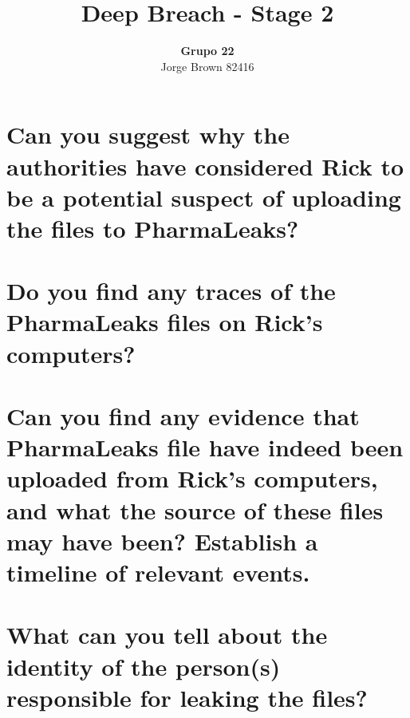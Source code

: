 \documentclass{report}
\author{\textbf{\huge{Grupo 22}}\vspace{2cm}\\Jorge Brown 82416}
\title{\textbf{\Huge{Deep Breach - Stage 2}}}
\begin{document}
    \maketitle
    \newpage

    \section*{Can you suggest why the authorities have considered Rick to be a potential suspect of uploading the files to PharmaLeaks?}
    

    \section*{Do you find any traces of the PharmaLeaks files on Rick’s computers?}
    

    \section*{Can you find any evidence that PharmaLeaks file have indeed been uploaded from Rick’s computers, and what the source of these files may have been? Establish a timeline of relevant events.}
    

    \section*{What can you tell about the identity of the person(s) responsible for leaking the files?}
    
\end{document}
